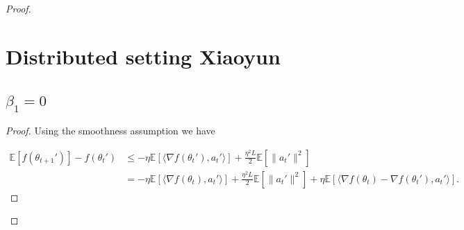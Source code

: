 \documentclass[11pt]{article}
\begin{document}
\begin{proof}
%
%
%
%
%
%
%
%

\section{Distributed setting Xiaoyun}

\subsection{$\beta_1=0$}
\begin{proof}
Using the smoothness assumption we have 

\begin{align}
    \mathbb E[f(\theta_{t+1}')]-f(\theta_t')&\leq -\eta\mathbb E[\langle \nabla f(\theta_t'), a_t'\rangle]+\frac{\eta^2L}{2}\mathbb E[\|a_t'\|^2] \nonumber\\
    &=-\eta\mathbb E[\langle \nabla f(\theta_t), a_t'\rangle]+\frac{\eta^2L}{2}\mathbb E[\|a_t'\|^2]+\eta\mathbb E[\langle \nabla f(\theta_t)-\nabla f(\theta_t'),a_t'\rangle]. \label{eq0betanull} 
\end{align}


\end{proof}
\end{proof}
\end{document}
